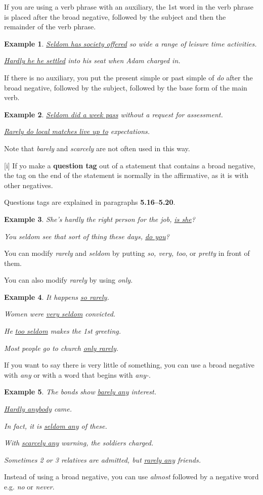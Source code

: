 \documentclass[oneside]{book}
\numberwithin{equation}{section}
\newtheorem{example}{Example}[section]
\begin{document}
If you are using a verb phrase with an auxiliary, the 1st word in the verb phrase is placed after the broad negative, followed by the subject and then the remainder of the verb phrase.
\begin{example}
    \underline{Seldom has society offered} so wide a range of leisure time activities.
    
    \underline{Hardly he he settled} into his seat when Adam charged in.
\end{example}
If there is no auxiliary, you put the present simple or past simple of \textit{do} after the broad negative, followed by the subject, followed by the base form of the main verb.
\begin{example}
    \underline{Seldom did a week pass} without a request for assessment.
    
    \underline{Rarely do local matches live up to} expectations.
\end{example}
Note that \textit{barely} and \textit{scarcely} are not often used in this way.

%
\noindent{} [i] If yo make a \textbf{question tag} out of a statement that contains a broad negative, the tag on the end of the statement is normally in the affirmative, as it is with other negatives.

Questions tags are explained in paragraphs \textbf{5.16--5.20}.
\begin{example}
    She's hardly the right person for the job, \underline{is she}?
    
    You seldom see that sort of thing these days, \underline{do you}?
\end{example}
You can modify \textit{rarely} and \textit{seldom} by putting \textit{so, very, too}, or \textit{pretty} in front of them.

You can also modify \textit{rarely} by using \textit{only}.
\begin{example}
    It happens \underline{so rarely}.
    
    Women were \underline{very seldom} convicted.
    
    He \underline{too seldom} makes the 1st greeting.
    
    Most people go to church \underline{only rarely}.
\end{example}
If you want to say there is very little of something, you can use a broad negative with \textit{any} or with a word that begins with \textit{any-}.
\begin{example}
    The bonds show \underline{barely any} interest.
    
    \underline{Hardly anybody} came.
    
    In fact, it is \underline{seldom any} of these.
    
    With \underline{scarcely any} warning, the soldiers charged.
    
    Sometimes 2 or 3 relatives are admitted, but \underline{rarely any} friends.
\end{example}
%
\noindent{} Instead of using a broad negative, you can use \textit{almost} followed by a negative word e.g. \textit{no} or \textit{never}.
\end{document}
